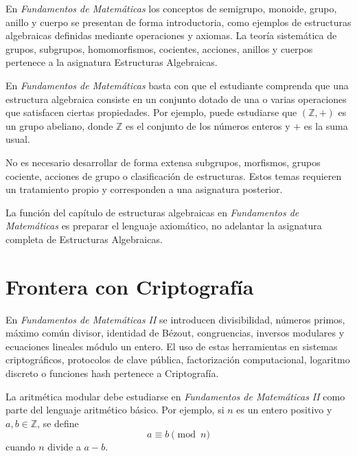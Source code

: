 \begin{convencion}
En \emph{Fundamentos de Matemáticas} los conceptos de semigrupo, monoide, grupo, anillo y cuerpo se presentan de forma introductoria, como ejemplos de estructuras algebraicas definidas mediante operaciones y axiomas. La teoría sistemática de grupos, subgrupos, homomorfismos, cocientes, acciones, anillos y cuerpos pertenece a la asignatura Estructuras Algebraicas.
\end{convencion}

En \emph{Fundamentos de Matemáticas} basta con que el estudiante comprenda que una estructura algebraica consiste en un conjunto dotado de una o varias operaciones que satisfacen ciertas propiedades. Por ejemplo, puede estudiarse que \((\mathbb{Z},+)\) es un grupo abeliano, donde \(\mathbb{Z}\) es el conjunto de los números enteros y \(+\) es la suma usual.

No es necesario desarrollar de forma extensa subgrupos, morfismos, grupos cociente, acciones de grupo o clasificación de estructuras. Estos temas requieren un tratamiento propio y corresponden a una asignatura posterior.

\begin{advertencia}
La función del capítulo de estructuras algebraicas en \emph{Fundamentos de Matemáticas} es preparar el lenguaje axiomático, no adelantar la asignatura completa de Estructuras Algebraicas.
\end{advertencia}

\section{Frontera con Criptografía}

\begin{convencion}
En \emph{Fundamentos de Matemáticas II} se introducen divisibilidad, números primos, máximo común divisor, identidad de Bézout, congruencias, inversos modulares y ecuaciones lineales módulo un entero. El uso de estas herramientas en sistemas criptográficos, protocolos de clave pública, factorización computacional, logaritmo discreto o funciones hash pertenece a Criptografía.
\end{convencion}

La aritmética modular debe estudiarse en \emph{Fundamentos de Matemáticas II} como parte del lenguaje aritmético básico. Por ejemplo, si \(n\) es un entero positivo y \(a,b\in\mathbb{Z}\), se define
\[
  a\equiv b \pmod n
\]
cuando \(n\) divide a \(a-b\).

